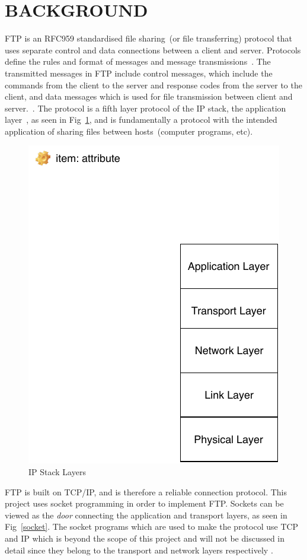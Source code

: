 \documentclass[journal, a4paper]{IEEEtran}
\begin{document}
\section{BACKGROUND}
FTP is an RFC959 \cite{rfc959} standardised file sharing~(or file transferring) protocol that uses separate control and data connections between a client and server\cite{tcp}. Protocols define the rules and format of messages and message transmissions~\cite{cn}. The transmitted messages in FTP include control messages, which include the commands from the client to the server and response codes from the server to the client, and data messages which is used for file transmission between client and server.~\cite{Bin}. The protocol is a fifth layer protocol of the IP stack, the application layer~\cite{gupta}, as seen in Fig~\ref{ipstack}, and is fundamentally a protocol with the intended application of sharing files between hosts~(computer programs, etc).


\begin{figure}[hbtp!]
	\centering
	\includegraphics[scale = 1.2]{IPStack}
	\caption{IP Stack Layers}
	\label {ipstack}
\end{figure}


FTP is built on TCP/IP, and is therefore a reliable connection protocol. This project uses socket programming in order to implement FTP. Sockets can be viewed as the \textit{door} connecting the application and transport layers, as seen in Fig~\ref{socket}. The socket programs which are used to make the protocol use TCP and IP which is beyond the scope of this project and will not be discussed in detail since they belong to the transport and network layers respectively \cite{cn}.
\end{document}
